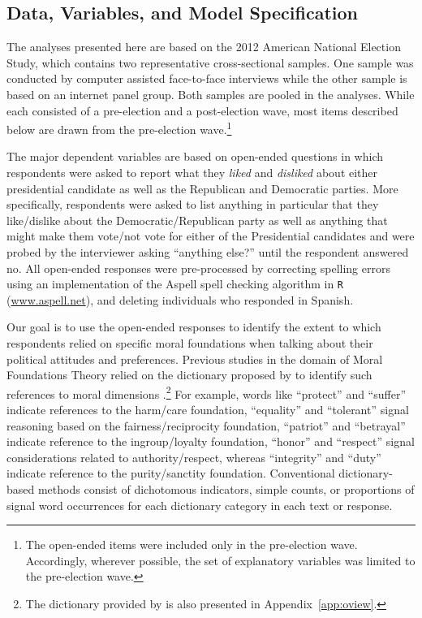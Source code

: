 \documentclass[12pt]{article}
\begin{document}
\subsection{Data, Variables, and Model Specification}

The analyses presented here are based on the 2012 American National Election Study, which contains two representative cross-sectional samples. One sample was conducted by computer assisted face-to-face interviews while the other sample is based on an internet panel group. Both samples are pooled in the analyses. While each consisted of a pre-election and a post-election wave, most items described below are drawn from the pre-election wave.\footnote{The open-ended items were included only in the pre-election wave. Accordingly, wherever possible, the set of explanatory variables was limited to the pre-election wave.}

The major dependent variables are based on open-ended questions in which respondents were asked to report what they \textit{liked} and \textit{disliked} about either presidential candidate as well as the Republican and Democratic parties. More specifically, respondents were asked to list anything in particular that they like/dislike about the Democratic/Republican party as well as anything that might make them vote/not vote for either of the Presidential candidates and were probed by the interviewer asking ``anything else?'' until the respondent answered no. All open-ended responses were pre-processed by correcting spelling errors using an implementation of the Aspell spell checking algorithm in \texttt{R} (\url{www.aspell.net}), and deleting individuals who responded in Spanish. 

Our goal is to use the open-ended responses to identify the extent to which respondents relied on specific moral foundations when talking about their political attitudes and preferences. Previous studies in the domain of Moral Foundations Theory relied on the dictionary proposed by \citet{graham2009liberals} to identify such references to moral dimensions \citep[e.g.][]{clifford2013words}.\footnote{The dictionary provided by \citet{graham2009liberals} is also presented in Appendix~\ref{app:oview}.} For example, words like ``protect'' and ``suffer'' indicate references to the harm/care foundation, ``equality'' and ``tolerant'' signal reasoning based on the fairness/reciprocity foundation, ``patriot'' and ``betrayal'' indicate reference to the ingroup/loyalty foundation, ``honor'' and ``respect'' signal considerations related to authority/respect, whereas ``integrity'' and ``duty'' indicate reference to the purity/sanctity foundation. Conventional dictionary-based methods consist of dichotomous indicators, simple counts, or proportions of signal word occurrences for each dictionary category in each text or response.
\end{document}

